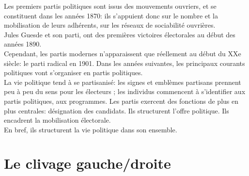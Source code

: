 \documentclass[10pt, a4paper, openany]{book}
\begin{document}
Les premiers partis politiques sont issus des mouvements ouvriers, et se constituent dans les années 1870: ils s'appuient donc sur le nombre et la mobilisation de leurs adhérents, sur les réseaux de sociabilité ouvrières. \\
Jules Guesde et son parti, ont des premières victoires électorales au début des années 1890. \\
Cependant, les partis modernes n'apparaissent que réellement au début du XXe siècle: le parti radical en 1901. Dans les années suivantes, les principaux courants politiques vont s'organiser en partis politiques. \\
La vie politique tend à se partisanisé: les signes et emblèmes partisans prennent peu à peu du sens pour les électeurs ; les individus commencent à s'identifier aux partis politiques, aux programmes. Les partis exercent des fonctions de plus en plus centrales: désignation des candidats. Ils structurent l'offre politique. Ils encadrent la mobilisation électorale. \\
En bref, ils structurent la vie politique dans son ensemble. 








\chapter{Le clivage gauche/droite}













\chapter{}
\end{document}
